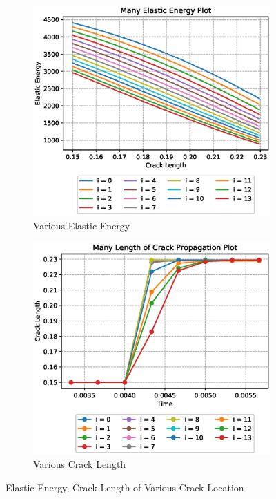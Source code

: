 \documentclass[a4paper,11pt]{article}
\begin{document}
\begin{figure}[h!]
	\begin{subfigure}[b]{0.49\linewidth}
		\centering
		\includegraphics[width=\linewidth]{picture/conference/manyelastic-avar}
		\caption{Various Elastic Energy}
		\label{fig:manyelastic-avar}
	\end{subfigure}
	\begin{subfigure}[b]{0.49\linewidth}
		\centering
		\includegraphics[width=\linewidth]{picture/conference/manycracklength-avar}
		\caption{Various Crack Length}
		\label{fig:manycracklength-avar}
	\end{subfigure}
	\caption{Elastic Energy, Crack Length of Various Crack Location}
	\label{fig:varcrack}
\end{figure}
\end{document}
